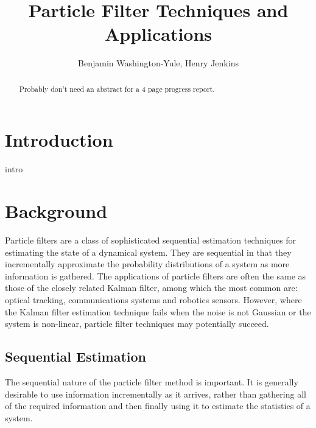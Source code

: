 \documentclass[11pt]{article}
\begin{document}
\title{Particle Filter Techniques and Applications}
\author{Benjamin Washington-Yule, Henry Jenkins}
\maketitle

\begin{abstract}
Probably don't need an abstract for a 4 page progress report.
\end{abstract}

\section{Introduction}
intro

\section{Background}
Particle filters are a class of sophisticated sequential estimation techniques
for estimating the state of a dynamical system. They are sequential in that they
incrementally approximate the probability distributions of a system as more
information is gathered. The applications of particle filters are often the
same as those of the closely related Kalman filter, among which the most common
are: optical tracking, communications systems and robotics sensors. However,
where the Kalman filter estimation technique fails when the noise is not
Gaussian or the system is non-linear, particle filter techniques may potentially
succeed.

\subsection{Sequential Estimation}
The sequential nature of the particle filter method is important. It is
generally desirable to use information incrementally as it arrives, rather
than gathering all of the required information and then finally using it to
estimate the statistics of a system. 
\end{document}
